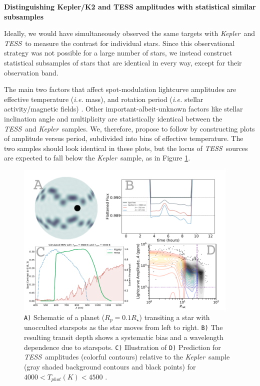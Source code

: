 \documentclass[letterpaper,11pt]{article}
\newcommand{\tess}{{\it TESS}}
\newcommand{\kepler}{{\it Kepler}}
\begin{document}
\textbf{Distinguishing Kepler/K2 and TESS amplitudes with statistical similar subsamples}

Ideally, we would have simultaneously observed the same targets with \kepler\ and \tess\ to measure the contrast for individual stars.  Since this observational strategy was not possible for a large number of stars, we instead construct statistical subsamples of stars that are identical in every way, except for their observation band.

The main two factors that affect spot-modulation lightcurve amplitudes are effective temperature (\emph{i.e.} mass), and rotation period (\emph{i.e.} stellar activity/magnetic fields) \citep{2014ApJS..211...24M}.  Other important-albeit-unknown factors like stellar inclination angle and multiplicity are statistically identical between the \tess\ and \kepler\ samples.  We, therefore, propose to follow \citet{2014ApJS..211...24M} by constructing plots of amplitude versus period, subdivided into bins of effective temperature.  The two samples should look identical in these plots, but the locus of \tess\ sources are expected to fall below the \kepler\ sample, as in Figure \ref{fig:predictAmps}.

\begin{figure}[hbt!]
\includegraphics[width=0.95\textwidth]{figures/multi_panel.pdf}
\caption{\texttt{A)} Schematic of a planet ($R_p = 0.1 R_\star$) transiting a star with unocculted starspots as the star moves from left to right.  \texttt{B)} The resulting transit depth shows a systematic bias and a wavelength dependence due to starspots. \texttt{C)} Illustration of \texttt{D)} Prediction for \tess\ amplitudes (colorful contours) relative to the \kepler\ sample (gray shaded background contours and black points) for $4000 < T_{phot} (K) < 4500$ \citep{2014ApJS..211...24M}.}
\label{fig:predictAmps}
\end{figure}
\end{document}
